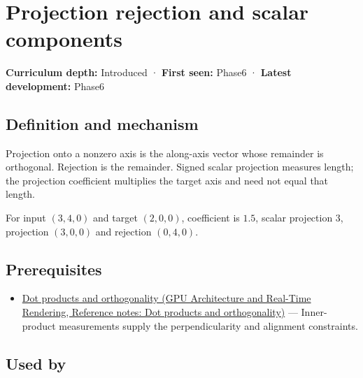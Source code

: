\hypertarget{appendix-505a502c372a}{}\label{referencestart:appendix-505a502c372a}
\section{Projection rejection and scalar components}\label{appendix-505a502c372a-projection-rejection-and-scalar-components}

\textbf{Curriculum depth:} Introduced · \textbf{First seen:} Phase6 · \textbf{Latest development:} Phase6

\subsection{Definition and mechanism}\label{appendix-505a502c372a-definition-and-mechanism}

Projection onto a nonzero axis is the along-axis vector whose remainder is orthogonal. Rejection is the remainder. Signed scalar projection measures length; the projection coefficient multiplies the target axis and need not equal that length.

For input \((3,4,0)\) and target \((2,0,0)\), coefficient is \(1.5\), scalar projection \(3\), projection \((3,0,0)\) and rejection \((0,4,0)\).

\subsection{Prerequisites}\label{appendix-505a502c372a-prerequisites}

\begin{itemize}
\tightlist
\item
  \href{../06-GPU-Architecture-and-Real-Time-Rendering/main.pdf\#nameddest=appendix-8bc4e8fc547c}{Dot products and orthogonality (GPU Architecture and Real-Time Rendering, Reference notes: Dot products and orthogonality)} --- Inner-product measurements supply the perpendicularity and alignment constraints.
\end{itemize}

\subsection{Used by}\label{appendix-505a502c372a-used-by}

